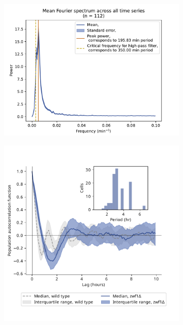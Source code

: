 \begin{figure}
  \begin{subfigure}[t]{0.45\textwidth}
   \centering
   \includegraphics[width=\textwidth]{zwf1egf_409_13.pdf}
   \caption{
   }
   \label{fig:biology-zwf1-fourier}
  \end{subfigure}%
  \begin{subfigure}[t]{0.45\textwidth}
   \centering
   \includegraphics[width=\textwidth]{zwf1egf_409_12.pdf}
   \caption{
   }
   \label{fig:biology-zwf1-acf}
  \end{subfigure}


\end{figure}
